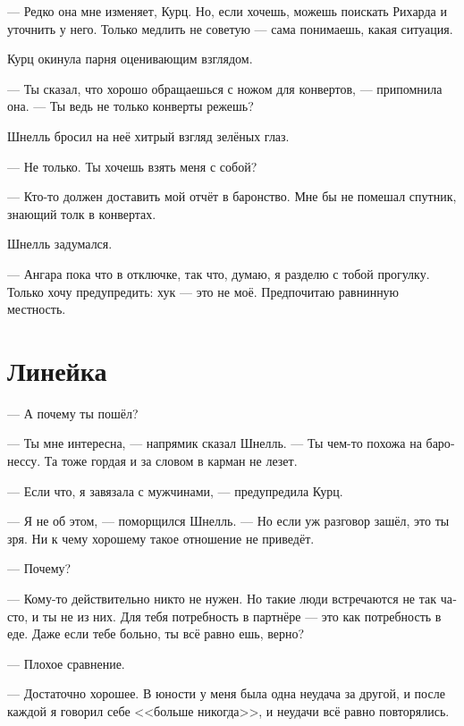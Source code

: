 \documentclass[a4paper,10pt,fleqn]{book}\usepackage{polyglossia}\setdefaultlanguage[babelshorthands=true]{russian}\setotherlanguage{english}\defaultfontfeatures{Ligatures=TeX,Mapping=tex-text}\usepackage{xcolor}\newcommand{\ml}[3]{#2}
\begin{document}
\ml{$0$}
{--- Редко она мне изменяет, Курц.}
{``That happens very rarely, Kurz.}
\ml{$0$}
{Но, если хочешь, можешь поискать Рихарда и уточнить у него.}
{But, if you insist, you can look for Richard and clear it with him.}
Только медлить не советую --- сама понимаешь, какая ситуация.

Курц окинула парня оценивающим взглядом.

--- Ты сказал, что хорошо обращаешься с ножом для конвертов, --- припомнила она.
\ml{$0$}
{--- Ты ведь не только конверты режешь?}
{``Your knife is good not only for envelopes, isn't it?''}

Шнелль бросил на неё хитрый взгляд зелёных глаз.

\ml{$0$}
{--- Не только.}
{``Not only.}
\ml{$0$}
{Ты хочешь взять меня с собой?}
{Do you want me to go with you?''}

--- Кто-то должен доставить мой отчёт в баронство.
\ml{$0$}
{Мне бы не помешал спутник, знающий толк в конвертах.}
{I could use a companion who knows envelopes.''}

Шнелль задумался.

--- Ангара пока что в отключке, так что, думаю, я разделю с тобой прогулку.
\ml{$0$}
{Только хочу предупредить: хук --- это не моё.}
{Just a fair warning: hook is not my piece of pie.}
\ml{$0$}
{Предпочитаю равнинную местность.}
{I prefer flat terrain.''}

\section{Линейка}

--- А почему ты пошёл?

--- Ты мне интересна, --- напрямик сказал Шнелль.
--- Ты чем-то похожа на баронессу.
Та тоже гордая и за словом в карман не лезет.

--- Если что, я завязала с мужчинами, --- предупредила Курц.

--- Я не об этом, --- поморщился Шнелль.
--- Но если уж разговор зашёл, это ты зря.
Ни к чему хорошему такое отношение не приведёт.

--- Почему?

--- Кому-то действительно никто не нужен.
Но такие люди встречаются не так часто, и ты не из них.
Для тебя потребность в партнёре --- это как потребность в еде.
Даже если тебе больно, ты всё равно ешь, верно?

--- Плохое сравнение.

--- Достаточно хорошее.
В юности у меня была одна неудача за другой, и после каждой я говорил себе <<больше никогда>>, и неудачи всё равно повторялись.
\end{document}
